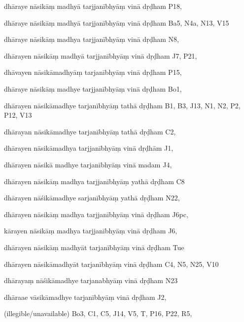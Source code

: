 \begin{ekdosis}
\begin{marma}[hp01_055]
\begin{marma}[hp02_009]
\begin{marma}[hp02_011]
\begin{marma}[hp02_65cd]
\item[dhāraye nāsikāṃ madhyā tarjjanībhyāṃ vinā dṛḍham] P18,
\item[dhāraye nāsikāṃ madhyā tarjjanībhyāṃ vinā dṛḍham] Ba5, N4a, N13, V15
\item[dhāraye nāsikāṃ madhya tarjjanībhyāṃ vinā dṛḍham] N8, 
\item[dhārayen nāsikāṃ madhyā tarjjanībhyāṃ vinā dṛḍham] J7, P21, 
\item[dhāvayen nāsikāmadhyāṃ tarjanībhyāṃ vinā dṛḍham] P15,
\item[dhāraye nāsikāṃ madhye tarjjanībhyāṃ vinā dṛḍham] Bo1,
\item[dhārayen nāsikāmadhye tarjanībhyāṃ tathā dṛḍham] B1, B3, J13, N1, N2, P2, P12, V13
\item[dhārayan nāsikāmadhye tarjanībhyāṃ tathā dṛḍham] C2, 
\item[dhārayen nāsikāmadhya tarjjanībhyāṃ vinā dṛḍhām] J1,
\item[dhārayen nāsikā madhye tarjanībhyāṃ vinā madam] J4,
\item[dhārayen nāsikāṃ madhya tarjjanībhyāṃ yathā dṛḍham] C8
\item[dhārayen nāśikāmadhye sarjanībhyāṃ yathā dṛḍham] N22,
\item[dhārayen nāsikāṃ madhya tarjjanībhyāṃ vinā dṛḍham] J6pc,
\item[kārayen nāsikāṃ madhya tarjjanībhyāṃ vinā dṛḍham] J6,
\item[dhārayen nāsikāṃ madhyāt tarjanībhyāṃ vinā dṛḍham] Tue
\item[dhārayen nāsikāmadhyāt tarjanībhyāṃ vinā dṛḍham] C4, N5, N25, V10
\item[dhārayaṃ nāśikāmadhye tarjanabhyāṃ vinā dṛḍham] N23
\item[dhāraae vāsikāmadhye tarjanībhyāṃ vinā dṛḍham] J2,
\item[(illegible/unavailable)] Bo3, C1, C5, J14, V5, T, P16, P22, R5,
  \begin{description}

    \end{description}
 \end{marma}


\end{marma}
\end{marma}
\end{marma}
\end{ekdosis}
